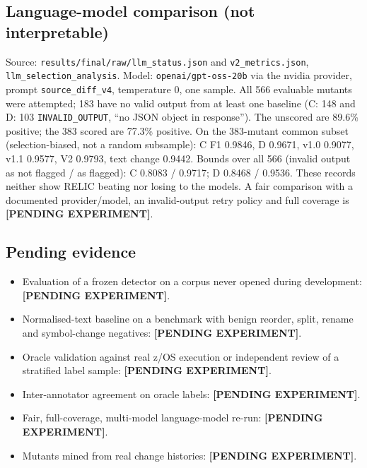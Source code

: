 \subsection{Language-model comparison (not interpretable)}
Source: \texttt{results/final/raw/llm\_status.json} and \texttt{v2\_metrics.json},
\texttt{llm\_selection\_analysis}. Model: \texttt{openai/gpt-oss-20b} via the
nvidia provider, prompt \texttt{source\_diff\_v4}, temperature 0, one sample.
All 566 evaluable mutants were attempted; 183 have no valid output from at least
one baseline (C: 148 and D: 103 \texttt{INVALID\_OUTPUT}, ``no JSON object in
response''). The unscored are 89.6\% positive; the 383 scored are 77.3\% positive.
On the 383-mutant common subset (selection-biased, not a random subsample):
C F1 0.9846, D 0.9671, v1.0 0.9077, v1.1 0.9577, V2 0.9793, text change 0.9442.
Bounds over all 566 (invalid output as not flagged / as flagged):
C 0.8083 / 0.9717; D 0.8468 / 0.9536. These records neither show RELIC beating
nor losing to the models. A fair comparison with a documented provider/model,
an invalid-output retry policy and full coverage is
\textbf{[PENDING EXPERIMENT]}.

\subsection{Pending evidence}
\begin{itemize}
  \item Evaluation of a frozen detector on a corpus never opened during development:
    \textbf{[PENDING EXPERIMENT]}.
  \item Normalised-text baseline on a benchmark with benign reorder, split, rename
    and symbol-change negatives: \textbf{[PENDING EXPERIMENT]}.
  \item Oracle validation against real z/OS execution or independent review of a
    stratified label sample: \textbf{[PENDING EXPERIMENT]}.
  \item Inter-annotator agreement on oracle labels: \textbf{[PENDING EXPERIMENT]}.
  \item Fair, full-coverage, multi-model language-model re-run:
    \textbf{[PENDING EXPERIMENT]}.
  \item Mutants mined from real change histories: \textbf{[PENDING EXPERIMENT]}.
\end{itemize}

